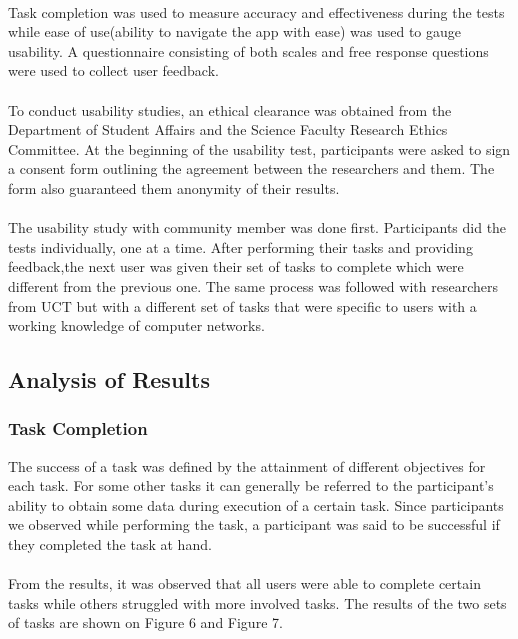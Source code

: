 \paragraph{}
Task completion was used to measure accuracy and effectiveness during the tests while ease of use(ability to navigate the app with ease) was used to gauge usability. A questionnaire consisting of both scales and free response questions were used to collect user feedback.
\paragraph{}
To conduct usability studies, an ethical clearance was obtained from the Department of Student Affairs and the Science Faculty Research Ethics Committee. At the beginning of the usability test, participants were asked to sign a consent form outlining the agreement between the researchers and them. The form also guaranteed them anonymity of their results.
\paragraph{}
The usability study with community member was done first. Participants did the tests individually, one at a time. After performing their tasks and providing feedback,the next user was given their set of tasks to complete which were different from the previous one. The same process was followed with researchers from UCT but with a different set of tasks that were specific to users with a working knowledge of computer networks.
\subsection{Analysis of Results}
\subsubsection{Task Completion}
The success of a task was defined by the attainment of different objectives for each task. For some other tasks it can generally be referred to the participant's ability to obtain some data during execution of a certain task. Since participants we observed while performing the task, a participant was said to be successful if they completed the task at hand.
\paragraph{}
From the results, it was observed that all users were able to complete certain tasks while others struggled with more involved tasks. The results of the  two sets of tasks are shown on Figure 6 and Figure 7.

